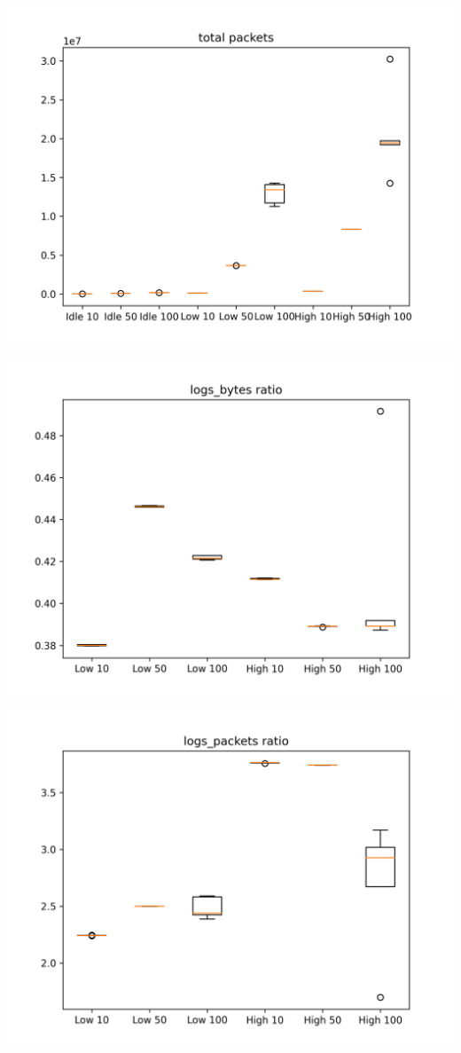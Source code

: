 \documentclass[12pt, a4paper]{article}
\begin{document}
\includegraphics{graphs/total packets.png}\label{graphs:tp}

\includegraphics{graphs/logs_bytes ratio.png}\label{graphs:lbr}

\includegraphics{graphs/logs_packets ratio.png}\label{graphs:lpr}
\end{document}

